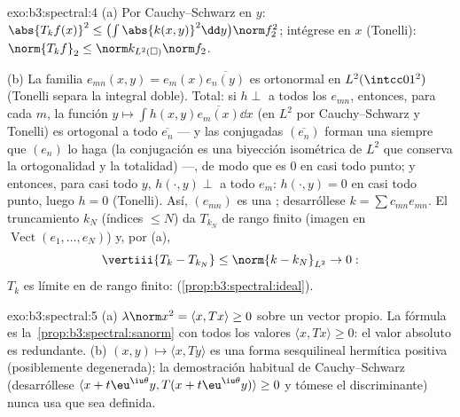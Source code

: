 \begin{solution}{exo:b3:spectral:4}
(a) Por Cauchy--Schwarz en $y$: $\abs{T_kf(x)}^2 \leq
\bigl(\int\abs{k(x,y)}^2\dd y\bigr)\norm f_2^2$; intégrese en $x$
(Tonelli): $\norm{T_kf}_2 \leq \norm k_{L^2(\square)}
\norm f_2$.

(b) La familia $e_{mn}(x,y) = e_m(x)\overline{e_n(y)}$ es ortonormal en
$L^2(\intcc01^2)$ (Tonelli separa la integral doble). Total: si
$h \perp$ a todos los $e_{mn}$, entonces, para cada $m$, la función
$y \mapsto \int h(x,y)\overline{e_m(x)}\dd
x$ (en $L^2$ por Cauchy--Schwarz y Tonelli) es ortogonal a todo
$\overline{e_n}$ --- y las conjugadas $(\overline{e_n})$ forman una
 siempre que $(e_n)$ lo
haga (la conjugación es una biyección isométrica de $L^2$ que conserva
la ortogonalidad y la totalidad) ---, de modo que es $0$ en casi todo
punto; y entonces, para casi todo $y$, $h(\cdot, y) \perp$ a todo $e_m$:
$h(\cdot, y) = 0$ en casi todo punto, luego $h = 0$ (Tonelli). Así,
$(e_{mn})$ es una ;
desarróllese $k = \sum c_{mn}e_{mn}$. El truncamiento $k_N$ (índices
$\leq N$) da $T_{k_N}$ de rango finito (imagen en
$\operatorname{Vect}(e_1, \dots,
e_N)$) y, por (a),
\[
\vertiii{T_k - T_{k_N}} \leq \norm{k - k_N}_{L^2} \to 0 :
\]
$T_k$ es límite en  de rango finito:
(\cref{prop:b3:spectral:ideal}).
\end{solution}

\begin{solution}{exo:b3:spectral:5}
(a) $\lambda\norm x^2 = \langle x, Tx\rangle \geq 0$ sobre un vector
propio. La fórmula es la~\cref{prop:b3:spectral:sanorm} con todos los
valores $\langle x,
Tx\rangle \geq 0$: el valor absoluto es redundante. (b)
$(x, y) \mapsto \langle x, Ty\rangle$ es una forma sesquilineal
hermítica positiva (posiblemente degenerada); la demostración habitual
de Cauchy--Schwarz (desarróllese $\langle x + t\eu^{\iu\theta}y,
T(x + t\eu^{\iu\theta}y)\rangle \geq 0$ y tómese el discriminante) nunca
usa que sea definida.
\end{solution}

